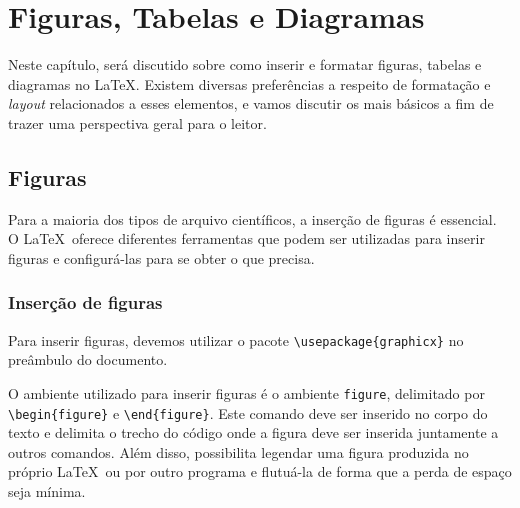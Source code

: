 %
%
%
\chapter{Figuras, Tabelas e Diagramas }
\label{intro} %


Neste cap\'itulo, ser\'a discutido sobre como inserir e formatar figuras, tabelas e diagramas no \LaTeX. Existem diversas prefer\^encias a respeito de formata\c c\~ao e \textit{layout} relacionados a esses elementos, e vamos discutir os mais b\'asicos a fim de trazer uma perspectiva geral para o leitor.

\section{Figuras}
\label{sec:1}
Para a maioria dos tipos de arquivo cient\'ificos, a inserção de figuras \'e essencial. O \LaTeX \ oferece diferentes ferramentas que podem ser utilizadas para inserir figuras e configurá-las para se obter o que precisa. 

\subsection{Inserção de figuras}

Para inserir figuras, devemos utilizar o pacote \verb|\usepackage{graphicx}| no pre\^ambulo do documento.

\noindent O ambiente utilizado para inserir figuras é o ambiente \verb|figure|, delimitado por \verb|\begin{figure}| e \verb|\end{figure}|. Este comando deve ser inserido no corpo do texto e delimita o trecho do c\'odigo onde a figura deve ser inserida juntamente a outros comandos. Além disso, possibilita legendar uma figura produzida no próprio \LaTeX \ ou por outro programa e flutu\'a-la de forma que a perda de espa\c co seja m\'inima.

